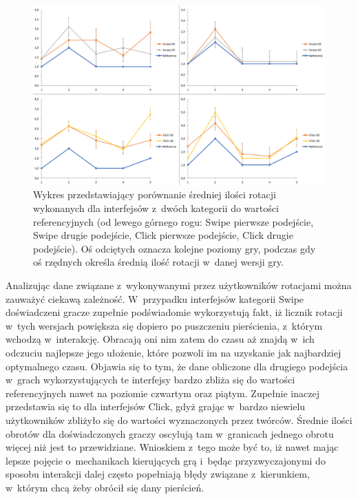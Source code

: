 \documentclass[a4paper,12pt,numbers=noenddot]{report}
\begin{document}
\begin{figure}[h!]
	\centering
  	\includegraphics[width=\linewidth]{diag/ref_rotations.png}
	\caption{Wykres przedstawiający porównanie średniej ilości rotacji wykonanych dla interfejsów z~dwóch kategorii do wartości referencyjnych (od lewego górnego rogu: Swipe pierwsze podejście, Swipe drugie podejście, Click pierwsze podejście, Click drugie podejście). Oś odciętych oznacza kolejne poziomy gry, podczas gdy oś rzędnych określa średnią ilość rotacji w~danej wersji gry.}
	\label{fig:ref:rotations}
\end{figure}

Analizując dane związane z~wykonywanymi przez użytkowników rotacjami można zauważyć ciekawą zależność. W~przypadku interfejsów kategorii Swipe doświadczeni gracze zupełnie podświadomie wykorzystują fakt, iż licznik rotacji w~tych wersjach powiększa się dopiero po puszczeniu pierścienia, z~którym wchodzą w~interakcję. Obracają oni nim zatem do czasu aż znajdą w~ich odczuciu najlepsze jego ułożenie, które pozwoli im na uzyskanie jak najbardziej optymalnego czasu. Objawia się to tym, że dane obliczone dla drugiego podejścia w~grach wykorzystujących te interfejsy bardzo zbliża się do wartości referencyjnych nawet na poziomie czwartym oraz piątym. Zupełnie inaczej przedstawia się to dla interfejsów Click, gdyż grając w~bardzo niewielu użytkowników zbliżyło się do wartości wyznaczonych przez twórców. Średnie ilości obrotów dla doświadczonych graczy oscylują tam w~granicach jednego obrotu więcej niż jest to przewidziane. Wnioskiem z~tego może być to, iż nawet mając lepsze pojęcie o~mechanikach kierujących grą i~będąc przyzwyczajonymi do sposobu interakcji dalej często popełniają błędy związane z~kierunkiem, w~którym chcą żeby obrócił się dany pierścień.
\end{document}
